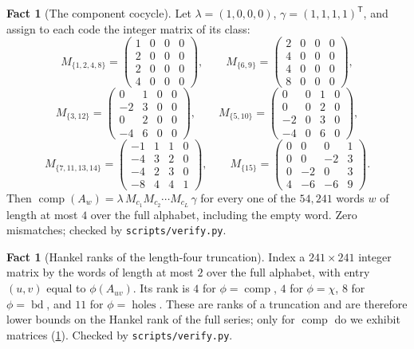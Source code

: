 \documentclass[11pt]{amsart}
\theoremstyle{definition}
\newtheorem{fact}[theorem]{Fact}
\theoremstyle{remark}
\begin{document}
\begin{fact}[The component cocycle]
\label{fact:cocycle}
Let $\lambda = (1,0,0,0)$, $\gamma = (1,1,1,1)^{\mathsf T}$, and assign to each code the integer matrix of its class:
\[
M_{\{1,2,4,8\}} = \begin{pmatrix} 1&0&0&0 \\ 2&0&0&0 \\ 2&0&0&0 \\ 4&0&0&0 \end{pmatrix}\!,
\qquad
M_{\{6,9\}} = \begin{pmatrix} 2&0&0&0 \\ 4&0&0&0 \\ 4&0&0&0 \\ 8&0&0&0 \end{pmatrix}\!,
\]
\[
M_{\{3,12\}} = \begin{pmatrix} 0&1&0&0 \\ -2&3&0&0 \\ 0&2&0&0 \\ -4&6&0&0 \end{pmatrix}\!,
\qquad
M_{\{5,10\}} = \begin{pmatrix} 0&0&1&0 \\ 0&0&2&0 \\ -2&0&3&0 \\ -4&0&6&0 \end{pmatrix}\!,
\]
\[
M_{\{7,11,13,14\}} = \begin{pmatrix} -1&1&1&0 \\ -4&3&2&0 \\ -4&2&3&0 \\ -8&4&4&1 \end{pmatrix}\!,
\qquad
M_{\{15\}} = \begin{pmatrix} 0&0&0&1 \\ 0&0&-2&3 \\ 0&-2&0&3 \\ 4&-6&-6&9 \end{pmatrix}\!.
\]
Then $\operatorname{comp}(A_w) = \lambda\,M_{c_1} M_{c_2} \cdots M_{c_L}\,\gamma$ for every one of the $54{,}241$ words $w$ of length at most $4$ over the full alphabet, including the empty word. Zero mismatches; checked by \texttt{scripts/verify.py}.
\end{fact}

\begin{fact}[Hankel ranks of the length-four truncation]
\label{fact:ranks}
Index a $241 \times 241$ integer matrix by the words of length at most $2$ over the full alphabet, with entry $(u,v)$ equal to $\phi(A_{uv})$. Its rank is $4$ for $\phi = \operatorname{comp}$, $4$ for $\phi = \chi$, $8$ for $\phi = \operatorname{bd}$, and $11$ for $\phi = \operatorname{holes}$. These are ranks of a truncation and are therefore lower bounds on the Hankel rank of the full series; only for $\operatorname{comp}$ do we exhibit matrices (\cref{fact:cocycle}). Checked by \texttt{scripts/verify.py}.
\end{fact}
\end{document}
